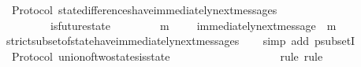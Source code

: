\begin{isabellebody}
\isanewline
%
\endisadelimproof
\isanewline
{}\isamarkupfalse%
\ {\isacharparenleft}\ Protocol{\isacharparenright}\ state{\isacharunderscore}differences{\isacharunderscore}have{\isacharunderscore}immediately{\isacharunderscore}next{\isacharunderscore}messages{\isacharcolon}\ \isanewline
\ \ {\isachardoublequoteopen}{\isasymforall}\ {\isasymsigma}\ {\isasymin}\ {\isasymSigma}{\isachardot}\ {\isasymforall}\ {\isasymsigma}{\isacharprime}{\isasymin}\ {\isasymSigma}{\isachardot}\ is{\isacharunderscore}future{\isacharunderscore}state\ {\isacharparenleft}{\isasymsigma}{\isacharcomma}\ {\isasymsigma}{\isacharprime}{\isacharparenright}\ {\isasymand}\ {\isasymsigma}\ {\isasymnoteq}\ {\isasymsigma}{\isacharprime}\ {\isasymlongrightarrow}\ {\isacharparenleft}{\isasymexists}\ m\ {\isasymin}\ {\isasymsigma}{\isacharprime}\ {\isacharminus}\ {\isasymsigma}{\isachardot}\ immediately{\isacharunderscore}next{\isacharunderscore}message\ {\isacharparenleft}{\isasymsigma}{\isacharcomma}\ m{\isacharparenright}{\isacharparenright}{\isachardoublequoteclose}\isanewline
%
\isadelimproof
\ \ %
\endisadelimproof
%
\isatagproof
{}\isamarkupfalse%
\ strict{\isacharunderscore}subset{\isacharunderscore}of{\isacharunderscore}state{\isacharunderscore}have{\isacharunderscore}immediately{\isacharunderscore}next{\isacharunderscore}messages\isanewline
\ \ \isamarkupfalse%
\ {\isacharparenleft}simp\ add{\isacharcolon}\ psubsetI{\isacharparenright}%
\endisatagproof
{\isafoldproof}%
%
\isadelimproof
\isanewline
%
\endisadelimproof
\isanewline
{}\isamarkupfalse%
\ {\isacharparenleft}\ Protocol{\isacharparenright}\ union{\isacharunderscore}of{\isacharunderscore}two{\isacharunderscore}states{\isacharunderscore}is{\isacharunderscore}state\ {\isacharcolon}\isanewline
\ \ {\isachardoublequoteopen}{\isasymforall}\ {\isasymsigma}{}\ {\isasymin}\ {\isasymSigma}{\isachardot}\ {\isasymforall}\ {\isasymsigma}{}\ {\isasymin}\ {\isasymSigma}{\isachardot}\ {\isacharparenleft}{\isasymsigma}{}\ {\isasymunion}\ {\isasymsigma}{}{\isacharparenright}\ {\isasymin}\ {\isasymSigma}{\isachardoublequoteclose}\isanewline
%
\isadelimproof
\ \ %
\endisadelimproof
%
\isatagproof
{}\isamarkupfalse%
\ {\isacharparenleft}rule{\isacharcomma}\ rule{\isacharparenright}\isanewline
{}\isamarkupfalse%
\ {\isacharminus}\ \isanewline
\ \ \isamarkupfalse%
\ {\isasymsigma}{}\ {\isasymsigma}{}\isanewline
\ \ \isamarkupfalse%

\end{isabellebody}
